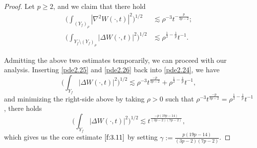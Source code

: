 \documentclass[13pt,CJK]{article}
\theoremstyle{plain}                       %
\theoremstyle{remark}
\numberwithin{equation}{section}
\begin{document}
\begin{proof}
Let $p\geq 2$, and we claim that there hold
\begin{subequations}\label{}
\begin{align}
 \bigg(
\int_{(Y_f)_{\rho}}|\nabla^2W(\cdot,t)|^2
\bigg)^{1/2}&\lesssim \rho^{-3}t^{-\frac{p}{3p-2}};\label{pde2.25}\\
 \bigg(
\int_{Y_f\setminus(Y_f)_{\rho}}|\Delta W(\cdot,t)|^2
\bigg)^{1/2}
&\lesssim \rho^{\frac{1}{2}-\frac{1}{p}}t^{-1}. \label{pde2.26}
\end{align}
\end{subequations}

Admitting the above two estimates temporarily,
we can proceed with our analysis. Inserting \eqref{pde2.25} and \eqref{pde2.26} back into \eqref{pde2.24}, we have
\begin{equation*}
\bigg(\int_{Y_f}|\Delta W(\cdot,t)|^2\bigg)^{1/2}\lesssim \rho^{-3}t^{\frac{-p}{3p-2}}+
\rho^{\frac{1}{2}-\frac{1}{p}}t^{-1},
\end{equation*}
and minimizing the right-side above by taking $\rho>0$ such that $\rho^{-3}t^{\frac{-p}{3p-2}}=
\rho^{\frac{1}{2}-\frac{1}{p}}t^{-1}$, there holds
\begin{equation*}
\bigg(\int_{Y_f}|\Delta W(\cdot,t)|^2\bigg)^{1/2}\lesssim
t^{\frac{-p(19p-14)}{(3p-2)(7p-2)}},
\end{equation*}
which gives us the core estimate $\eqref{f:3.11}$ by setting
$\gamma:=\frac{p(19p-14)}{(3p-2)(7p-2)}$.




\end{proof}
\end{document}

